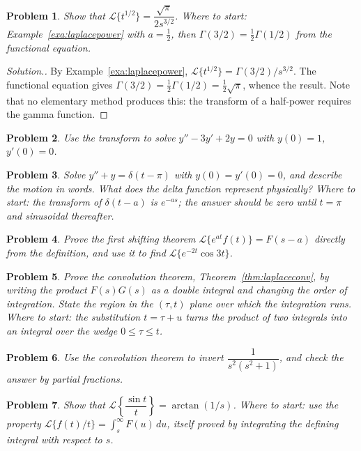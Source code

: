 \documentclass[12pt,a4paper]{report}
\theoremstyle{definition}
\theoremstyle{plain}
\newtheorem{problemx}{Problem}[section]
\newenvironment{problem}{\begin{problemx}}{\end{problemx}}
\newenvironment{solution}
  {\renewcommand{\qedsymbol}{}\begin{proof}[\textit{Solution}.]}
  {\end{proof}}
\begin{document}
\begin{problem}
Show that $\mathcal{L}\{t^{1/2}\} = \dfrac{\sqrt{\pi}}{2s^{3/2}}$.
\emph{Where to start: Example~\ref{exa:laplacepower} with $a=\tfrac12$, then
$\Gamma(3/2)=\tfrac12\Gamma(1/2)$ from the functional equation.}
\end{problem}

\begin{solution}
By Example~\ref{exa:laplacepower},
$\mathcal{L}\{t^{1/2}\} = \Gamma(3/2)/s^{3/2}$. The functional equation gives
$\Gamma(3/2) = \tfrac12\Gamma(1/2) = \tfrac12\sqrt{\pi}$, whence the result.
Note that no elementary method produces this: the transform of a half-power
requires the gamma function.
\end{solution}

\begin{problem}
Use the transform to solve $y''-3y'+2y = 0$ with $y(0)=1$, $y'(0)=0$.
\end{problem}

\begin{problem}
Solve $y'' + y = \delta(t-\pi)$ with $y(0)=y'(0)=0$, and describe the motion in
words. What does the delta function represent physically?
\emph{Where to start: the transform of $\delta(t-a)$ is $e^{-as}$; the answer
should be zero until $t=\pi$ and sinusoidal thereafter.}
\end{problem}

\begin{problem}
Prove the first shifting theorem $\mathcal{L}\{e^{at}f(t)\}=F(s-a)$ directly
from the definition, and use it to find $\mathcal{L}\{e^{-2t}\cos 3t\}$.
\end{problem}

\begin{problem}
Prove the convolution theorem, Theorem~\ref{thm:laplaceconv}, by writing the
product $F(s)G(s)$ as a double integral and changing the order of integration.
State the region in the $(\tau,t)$ plane over which the integration runs.
\emph{Where to start: the substitution $t = \tau + u$ turns the product of two
integrals into an integral over the wedge $0\leq\tau\leq t$.}
\end{problem}

\begin{problem}
Use the convolution theorem to invert $\dfrac{1}{s^{2}\left(s^{2}+1\right)}$,
and check the answer by partial fractions.
\end{problem}

\begin{problem}
Show that $\mathcal{L}\left\{\dfrac{\sin t}{t}\right\} = \arctan\left(1/s\right)$.
\emph{Where to start: use the property $\mathcal{L}\{f(t)/t\} =
\int^{\infty}_{s}F(u)\,du$, itself proved by integrating the defining integral
with respect to $s$.}
\end{problem}
\end{document}

